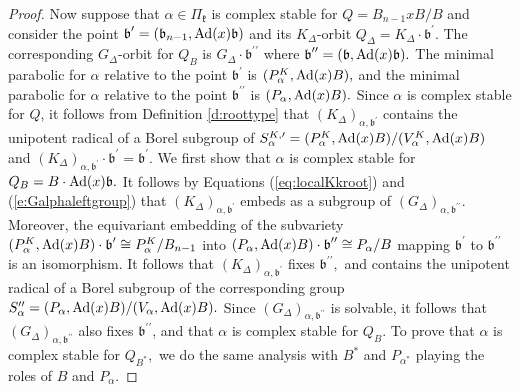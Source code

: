 \documentclass[12pt]{amsart}
\numberwithin{equation}{section}
\newcommand{\fk}{\mbox{${\mathfrak k}$}}
\newcommand{\fb}{\mbox{${\mathfrak b}$}}
\newcommand{\Ad}{{\rm Ad}}
\begin{document}
\begin{proof}
Now suppose that $\alpha\in \Pi_{\fk}$ is complex stable for $Q=B_{n-1}xB/B$ and consider the point $\fb^{\prime}=(\fb_{n-1},\Ad(x)\fb)$ and its $K_{\Delta}$-orbit $Q_{\Delta}=K_{\Delta}\cdot \fb^{\prime}.$  The corresponding $G_{\Delta}$-orbit for $Q_B$ is $G_{\Delta}\cdot \fb^{\prime\prime}$ where $\fb^{\prime\prime}= (\fb,\Ad(x)\fb).$ 
The minimal parabolic for $\alpha$ relative to the point $\fb^{\prime}$ is $(P_{\alpha}^{K},\Ad(x)B),$ and the minimal parabolic for $\alpha$ relative to the point $\fb^{\prime\prime}$ is $(P_{\alpha}, \Ad(x)B).$  Since $\alpha$ is complex stable for $Q$, it follows from Definition \ref{d:roottype} that $(K_{\Delta})_{\alpha,\fb^{\prime}}$ contains the unipotent radical of a Borel subgroup of $S_{\alpha}^{K,\prime}=(P_{\alpha}^{K},\Ad(x)B)/(V_{\alpha}^{K},\Ad(x)B)$ and $(K_{\Delta})_{\alpha,\fb^{\prime}}\cdot\fb^{\prime}=\fb^{\prime}.$  We first show that $\alpha$ is complex stable for $Q_B=B\cdot \Ad(x)\fb.$   It follows by Equations (\ref{eq:localKkroot}) and (\ref{e:Galphaleftgroup}) that $(K_{\Delta})_{\alpha, \fb^{\prime}}$ embeds as a subgroup of $(G_{\Delta})_{\alpha, \fb^{\prime\prime}}.$   Moreover, the equivariant embedding of the subvariety $(P_{\alpha}^{K},\Ad(x)B)\cdot \fb^{\prime}\cong P_{\alpha}^K/B_{n-1}$ into $(P_{\alpha},\Ad(x)B)\cdot \fb^{\prime\prime}\cong P_{\alpha}/B$ mapping $\fb^{\prime}$ to $\fb^{\prime\prime}$ is  an isomorphism.  It follows that $(K_{\Delta})_{\alpha,\fb^{\prime}}$ fixes $\fb^{\prime\prime},$ and contains the unipotent radical of a Borel subgroup of the corresponding group $S_{\alpha}^{\prime\prime}=(P_{\alpha},\Ad(x)B)/(V_{\alpha},\Ad(x)B).$    Since $(G_{\Delta})_{\alpha, \fb^{\prime\prime}}$ is solvable, it follows that $(G_{\Delta})_{\alpha, \fb^{\prime\prime}}$ also fixes $\fb^{\prime\prime}$, and that $\alpha$ is complex stable for $Q_B.$   To prove that $\alpha$ is complex stable for $Q_{B^*},$ we do the same analysis with $B^*$ and $P_{\alpha^*}$ playing the roles of $B$ and $P_{\alpha}.$
 




\end{proof}
\end{document}
